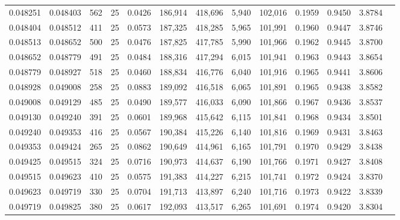 \begin{tabular}{rrrrrrrrrrrrr}
0.048251 & 0.048403 &   562 &  25 &                                     0.0426 & 186,914 & 418,696 &   5,940 & 102,016 & 0.1959 & 0.9450 & 3.8784 \\
0.048404 & 0.048512 &   411 &  25 &                                     0.0573 & 187,325 & 418,285 &   5,965 & 101,991 & 0.1960 & 0.9447 & 3.8746 \\
0.048513 & 0.048652 &   500 &  25 &                                     0.0476 & 187,825 & 417,785 &   5,990 & 101,966 & 0.1962 & 0.9445 & 3.8700 \\
0.048652 & 0.048779 &   491 &  25 &                                     0.0484 & 188,316 & 417,294 &   6,015 & 101,941 & 0.1963 & 0.9443 & 3.8654 \\
0.048779 & 0.048927 &   518 &  25 &                                     0.0460 & 188,834 & 416,776 &   6,040 & 101,916 & 0.1965 & 0.9441 & 3.8606 \\
0.048928 & 0.049008 &   258 &  25 &                                     0.0883 & 189,092 & 416,518 &   6,065 & 101,891 & 0.1965 & 0.9438 & 3.8582 \\
0.049008 & 0.049129 &   485 &  25 &                                     0.0490 & 189,577 & 416,033 &   6,090 & 101,866 & 0.1967 & 0.9436 & 3.8537 \\
0.049130 & 0.049240 &   391 &  25 &                                     0.0601 & 189,968 & 415,642 &   6,115 & 101,841 & 0.1968 & 0.9434 & 3.8501 \\
0.049240 & 0.049353 &   416 &  25 &                                     0.0567 & 190,384 & 415,226 &   6,140 & 101,816 & 0.1969 & 0.9431 & 3.8463 \\
0.049353 & 0.049424 &   265 &  25 &                                     0.0862 & 190,649 & 414,961 &   6,165 & 101,791 & 0.1970 & 0.9429 & 3.8438 \\
0.049425 & 0.049515 &   324 &  25 &                                     0.0716 & 190,973 & 414,637 &   6,190 & 101,766 & 0.1971 & 0.9427 & 3.8408 \\
0.049515 & 0.049623 &   410 &  25 &                                     0.0575 & 191,383 & 414,227 &   6,215 & 101,741 & 0.1972 & 0.9424 & 3.8370 \\
0.049623 & 0.049719 &   330 &  25 &                                     0.0704 & 191,713 & 413,897 &   6,240 & 101,716 & 0.1973 & 0.9422 & 3.8339 \\
0.049719 & 0.049825 &   380 &  25 &                                     0.0617 & 192,093 & 413,517 &   6,265 & 101,691 & 0.1974 & 0.9420 & 3.8304 \\

\end{tabular}
